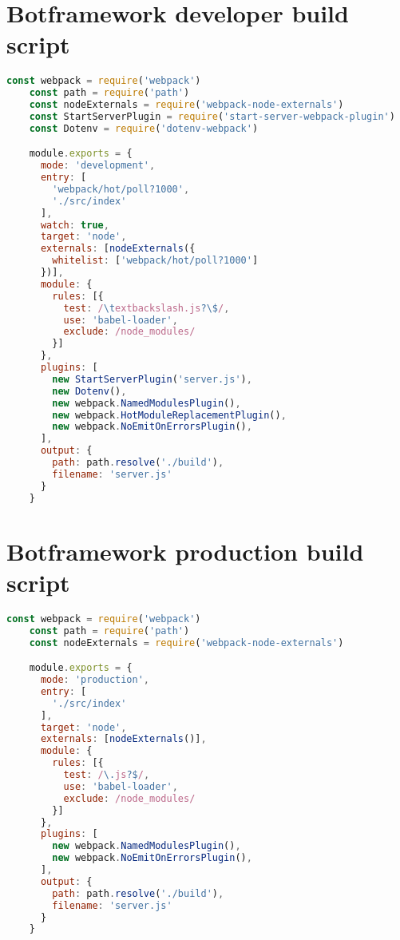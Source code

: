 \begin{appendices}
  \chapter{Botframework developer build script}\label{appendix:botframeworkdevscript}
  \begin{lstlisting}[language=JavaScript]
    const webpack = require('webpack')
    const path = require('path')
    const nodeExternals = require('webpack-node-externals')
    const StartServerPlugin = require('start-server-webpack-plugin')
    const Dotenv = require('dotenv-webpack')

    module.exports = {
      mode: 'development',
      entry: [
        'webpack/hot/poll?1000',
        './src/index'
      ],
      watch: true,
      target: 'node',
      externals: [nodeExternals({
        whitelist: ['webpack/hot/poll?1000']
      })],
      module: {
        rules: [{
          test: /\textbackslash.js?\$/,
          use: 'babel-loader',
          exclude: /node_modules/
        }]
      },
      plugins: [
        new StartServerPlugin('server.js'),
        new Dotenv(),
        new webpack.NamedModulesPlugin(),
        new webpack.HotModuleReplacementPlugin(),
        new webpack.NoEmitOnErrorsPlugin(),
      ],
      output: {
        path: path.resolve('./build'),
        filename: 'server.js'
      }
    }
  \end{lstlisting}

  \chapter{Botframework production build script}\label{appendix:botframeworkprodscript}
  \begin{lstlisting}[language=JavaScript]
    const webpack = require('webpack')
    const path = require('path')
    const nodeExternals = require('webpack-node-externals')

    module.exports = {
      mode: 'production',
      entry: [
        './src/index'
      ],
      target: 'node',
      externals: [nodeExternals()],
      module: {
        rules: [{
          test: /\.js?$/,
          use: 'babel-loader',
          exclude: /node_modules/
        }]
      },
      plugins: [
        new webpack.NamedModulesPlugin(),
        new webpack.NoEmitOnErrorsPlugin(),
      ],
      output: {
        path: path.resolve('./build'),
        filename: 'server.js'
      }
    }
  \end{lstlisting}
\end{appendices}